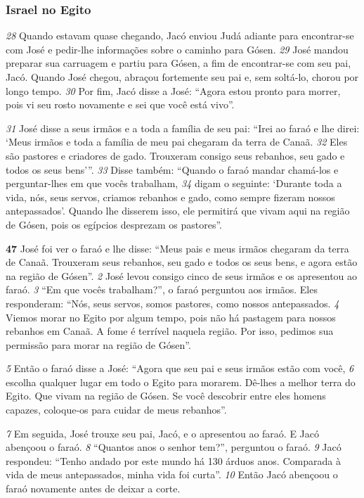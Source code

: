 \bigskip
\subsubsection*{Israel no Egito}
\textit{\tiny 28}
Quando estavam quase chegando, Jacó enviou Judá adiante para encontrar-se
com José e pedir-lhe informações sobre o caminho para Gósen. 
\textit{\tiny 29}
José mandou
preparar sua carruagem e partiu para Gósen, a fim de encontrar-se com seu pai,
Jacó. Quando José chegou, abraçou fortemente seu pai e, sem soltá-lo, chorou por
longo tempo. 
\textit{\tiny 30}
Por fim, Jacó disse a José: “Agora estou pronto para morrer, pois vi
seu rosto novamente e sei que você está vivo”.

\bigskip
\textit{\tiny 31}
José disse a seus irmãos e a toda a família de seu pai: “Irei ao faraó e lhe direi:
‘Meus irmãos e toda a família de meu pai chegaram da terra de Canaã. 
\textit{\tiny 32}
Eles são
pastores e criadores de gado. Trouxeram consigo seus rebanhos, seu gado e todos
os seus bens’”.
\textit{\tiny 33}
Disse também: “Quando o faraó mandar chamá-los e perguntar-lhes em que
vocês trabalham, 
\textit{\tiny 34}
digam o seguinte: ‘Durante toda a vida, nós, seus servos,
criamos rebanhos e gado, como sempre fizeram nossos antepassados’. Quando
lhe disserem isso, ele permitirá que vivam aqui na região de Gósen, pois os
egípcios desprezam os pastores”.

\bigskip
  \textbf{\large 47} José foi ver o faraó e lhe disse: “Meus pais e meus irmãos chegaram da
terra de Canaã. Trouxeram seus rebanhos, seu gado e todos os seus bens, e agora
estão na região de Gósen”. 
\textit{\tiny 2} 
José levou consigo cinco de seus irmãos e os apresentou ao faraó. 
\textit{\tiny 3} 
“Em que
vocês trabalham?”, o faraó perguntou aos irmãos.
   Eles responderam: “Nós, seus servos, somos pastores, como nossos
antepassados. 
\textit{\tiny 4} 
Viemos morar no Egito por algum tempo, pois não há pastagem
para nossos rebanhos em Canaã. A fome é terrível naquela região. Por isso,
pedimos sua permissão para morar na região de Gósen”. 

\bigskip
\textit{\tiny 5} 
Então o faraó disse a José: “Agora que seu pai e seus irmãos estão com você, 
\textit{\tiny 6} 
escolha qualquer lugar em todo o Egito para morarem. Dê-lhes a melhor terra do
Egito. Que vivam na região de Gósen. Se você descobrir entre eles homens
capazes, coloque-os para cuidar de meus rebanhos”. 

\bigskip
\textit{\tiny 7} 
Em seguida, José trouxe seu pai, Jacó, e o apresentou ao faraó. E Jacó abençoou
o faraó. 
\textit{\tiny 8} 
“Quantos anos o senhor tem?”, perguntou o faraó. 
\textit{\tiny 9} 
Jacó respondeu: “Tenho andado por este mundo há 130
 árduos anos.
Comparada à vida de meus antepassados, minha vida foi curta”. 
\textit{\tiny 10}
Então Jacó
abençoou o faraó novamente antes de deixar a corte.

